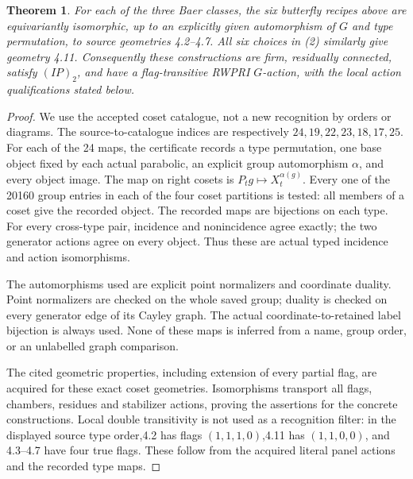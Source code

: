 \documentclass[11pt]{article}
\newtheorem{theorem}{Theorem}\newtheorem{lemma}[theorem]{Lemma}
\begin{document}
\begin{theorem}
For each of the three Baer classes, the six butterfly recipes above are
equivariantly isomorphic, up to an explicitly given automorphism of $G$
and type permutation, to source geometries 4.2--4.7. All six choices in (2)
similarly give geometry 4.11. Consequently these constructions are firm,
residually connected, satisfy $(IP)_2$, and have a flag-transitive RWPRI
$G$-action, with the local action qualifications stated below.
\end{theorem}
\begin{proof}
We use the accepted coset catalogue, not a new recognition by orders or
diagrams. The source-to-catalogue indices are respectively
$24,19,22,23,18,17,25$. For each of the 24 maps, the certificate records
a type permutation, one base object fixed by each actual parabolic, an
explicit group automorphism $\alpha$, and every object image. The map on
right cosets is
$P_tg\mapsto X_t^{\alpha(g)}$.
Every one of the 20160 group entries in each of the four coset partitions
is tested: all members of a coset give the recorded object. The recorded
maps are bijections on each type. For every cross-type pair, incidence
and nonincidence agree exactly; the two generator actions agree on every
object. Thus these are actual typed incidence and action isomorphisms.

The automorphisms used are explicit point normalizers and coordinate duality.
Point normalizers are checked on the whole saved group; duality is checked
on every generator edge of its Cayley graph. The actual coordinate-to-retained
label bijection is always used. None of these maps is inferred from a name,
group order, or an unlabelled graph comparison.

The cited geometric properties, including extension of every partial flag,
are acquired for these exact coset geometries. Isomorphisms transport all
flags, chambers, residues and stabilizer actions, proving the assertions
for the concrete constructions. Local double transitivity is not used as
a recognition filter: in the displayed source type order,4.2 has flags
$(1,1,1,0)$,4.11 has $(1,1,0,0)$, and 4.3--4.7 have four true flags.
These follow from the acquired literal panel actions and the recorded type maps.
\end{proof}
\end{document}
